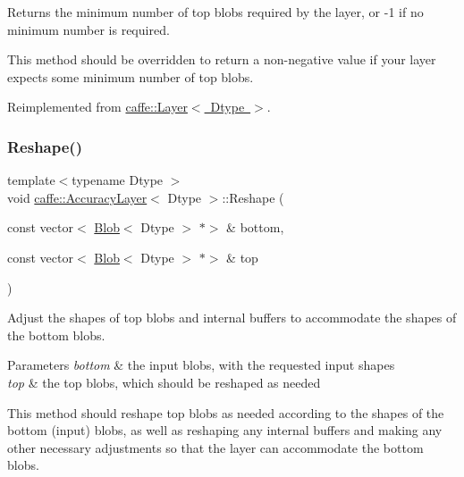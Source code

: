 Returns the minimum number of top blobs required by the layer, or -\/1 if no minimum number is required. 

This method should be overridden to return a non-\/negative value if your layer expects some minimum number of top blobs. 

Reimplemented from \mbox{\hyperlink{classcaffe_1_1_layer_ab9e4c8d642e413948b131d851a8462a4}{caffe\+::\+Layer$<$ Dtype $>$}}.

\mbox{\label{classcaffe_1_1_accuracy_layer_aa2b680fc1e754440c2babd150e09f2f6}} 
\subsubsection{\texorpdfstring{Reshape()}{Reshape()}\hspace{0.1cm}{\footnotesize\ttfamily [1/2]}}
{\footnotesize\ttfamily template$<$typename Dtype $>$ \\
void \mbox{\hyperlink{classcaffe_1_1_accuracy_layer}{caffe\+::\+Accuracy\+Layer}}$<$ Dtype $>$\+::Reshape (\begin{DoxyParamCaption}\item[{const vector$<$ \mbox{\hyperlink{classcaffe_1_1_blob}{Blob}}$<$ Dtype $>$ $\ast$$>$ \&}]{bottom,  }\item[{const vector$<$ \mbox{\hyperlink{classcaffe_1_1_blob}{Blob}}$<$ Dtype $>$ $\ast$$>$ \&}]{top }\end{DoxyParamCaption})\hspace{0.3cm}{\ttfamily [virtual]}}



Adjust the shapes of top blobs and internal buffers to accommodate the shapes of the bottom blobs. 


\begin{DoxyParams}{Parameters}
{\em bottom} & the input blobs, with the requested input shapes \\
\hline
{\em top} & the top blobs, which should be reshaped as needed\\
\hline
\end{DoxyParams}
This method should reshape top blobs as needed according to the shapes of the bottom (input) blobs, as well as reshaping any internal buffers and making any other necessary adjustments so that the layer can accommodate the bottom blobs. 

